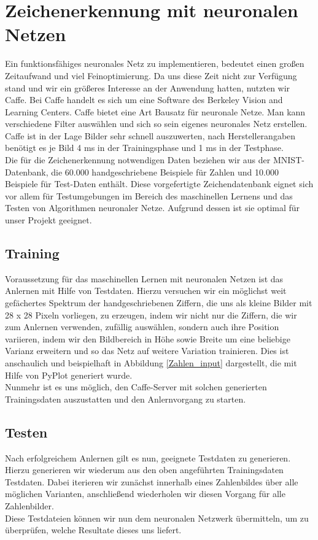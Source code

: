\section{Zeichenerkennung mit neuronalen Netzen}

Ein funktionsfähiges neuronales Netz zu implementieren, bedeutet einen großen Zeitaufwand und viel Feinoptimierung. Da uns diese Zeit nicht zur Verfügung stand und wir ein größeres Interesse an der Anwendung hatten, nutzten wir Caffe. Bei Caffe handelt es sich um eine Software des Berkeley Vision and Learning Centers. Caffe bietet eine Art Bausatz für neuronale Netze. Man kann verschiedene Filter auswählen und sich so sein eigenes neuronales Netz erstellen. Caffe ist in der Lage Bilder sehr schnell auszuwerten, nach Herstellerangaben benötigt es je Bild 4 ms in der Trainingsphase und 1 ms in der Testphase. \\
Die für die Zeichenerkennung notwendigen Daten beziehen wir aus der MNIST-Datenbank, die 60.000 handgeschriebene Beispiele für Zahlen und 10.000 Beispiele für Test-Daten enthält. Diese vorgefertigte Zeichendatenbank eignet sich vor allem für Testumgebungen im Bereich des maschinellen Lernens und das Testen von Algorithmen neuronaler Netze. Aufgrund dessen ist sie optimal für unser Projekt geeignet.

\subsection{Training}
Voraussetzung für das maschinellen Lernen mit neuronalen Netzen ist das Anlernen mit Hilfe von Testdaten. Hierzu versuchen wir ein möglichst weit gefächertes Spektrum der handgeschriebenen Ziffern, die uns als kleine Bilder mit 28 x 28 Pixeln vorliegen, zu erzeugen, indem wir nicht nur die Ziffern, die wir zum Anlernen verwenden, zufällig auswählen, sondern auch ihre Position variieren, indem wir den Bildbereich in Höhe sowie Breite um eine beliebige Varianz erweitern und so das Netz auf weitere Variation trainieren. Dies ist anschaulich und beispielhaft in Abbildung  \ref{Zahlen_input} dargestellt, die mit Hilfe von PyPlot generiert wurde.\\

Nunmehr ist es uns möglich, den Caffe-Server mit solchen generierten Trainingsdaten auszustatten und den Anlernvorgang zu starten.

\subsection{Testen}
Nach erfolgreichem Anlernen gilt es nun, geeignete Testdaten zu generieren. Hierzu generieren wir wiederum aus den oben angeführten Trainingsdaten Testdaten. Dabei iterieren wir zunächst innerhalb eines Zahlenbildes über alle möglichen Varianten, anschließend wiederholen wir diesen Vorgang für alle Zahlenbilder. \\
Diese Testdateien können wir nun dem neuronalen Netzwerk übermitteln, um zu überprüfen, welche Resultate dieses uns liefert.